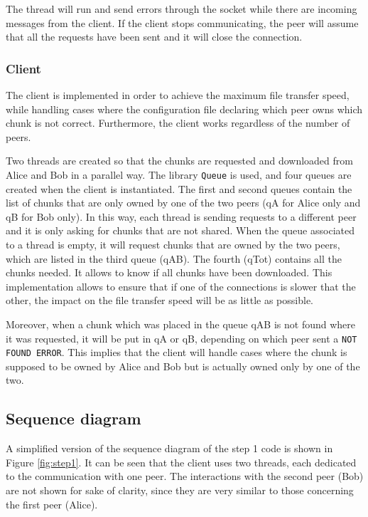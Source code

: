 The thread will run and send errors through the socket while there are incoming messages from the client. If the client stops communicating, the peer will assume that all the requests have been sent and it will close the connection.

\subsubsection{Client}

The client is implemented in order to achieve the maximum file transfer speed, while handling cases where the configuration file declaring which peer owns which chunk is not correct. Furthermore, the client works regardless of the number of peers.

Two threads are created so that the chunks are requested and downloaded from Alice and Bob in a parallel way. The library \texttt{Queue} is used, and four queues are created when the client is instantiated. The first and second queues contain the list of chunks that are only owned by one of the two peers (qA for Alice only and qB for Bob only). In this way, each thread is sending requests to a different peer and it is only asking for chunks that are not shared. When the queue associated to a thread is empty, it will request chunks that are owned by the two peers, which are listed in the third queue (qAB). The fourth (qTot) contains all the chunks needed. It allows to know if all chunks have been downloaded. This implementation allows to ensure that if one of the connections is slower that the other, the impact on the file transfer speed will be as little as possible.

Moreover, when a chunk which was placed in the queue qAB is not found where it was requested, it will be put in qA or qB, depending on which peer sent a \texttt{NOT FOUND ERROR}. This implies that the client will handle cases where the chunk is supposed to be owned by Alice and Bob but is actually owned only by one of the two.

\subsection{Sequence diagram}

A simplified version of the sequence diagram of the step 1 code is shown in Figure \ref{fig:step1}. It can be seen that the client uses two threads, each dedicated to the communication with one peer. The interactions with the second peer (Bob) are not shown for sake of clarity, since they are very similar to those concerning the first peer (Alice).


